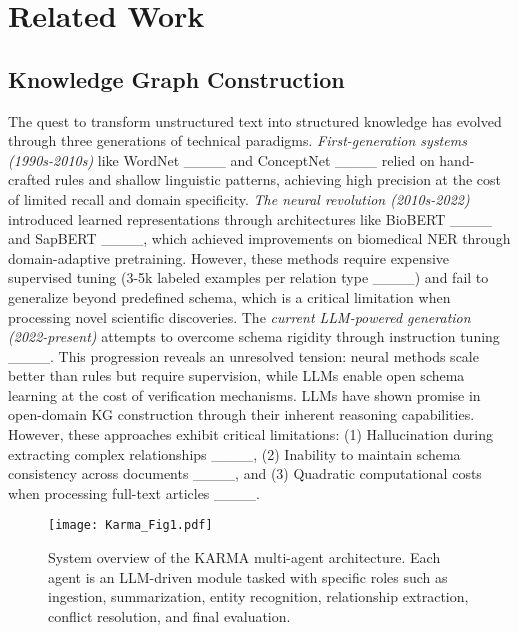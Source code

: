 \section{Related Work}
\subsection{Knowledge Graph Construction}
The quest to transform unstructured text into structured knowledge has evolved through three generations of technical paradigms. \emph{First-generation systems (1990s-2010s)} like WordNet ____ and ConceptNet ____ relied on hand-crafted rules and shallow linguistic patterns, achieving high precision at the cost of limited recall and domain specificity. \emph{The neural revolution (2010s-2022)} introduced learned representations through architectures like BioBERT ____ and SapBERT ____, which achieved improvements on biomedical NER through domain-adaptive pretraining. However, these methods require expensive supervised tuning (3-5k labeled examples per relation type ____) and fail to generalize beyond predefined schema, which is a critical limitation when processing novel scientific discoveries. The \emph{current LLM-powered generation (2022-present)} attempts to overcome schema rigidity through instruction tuning ____. This progression reveals an unresolved tension: neural methods scale better than rules but require supervision, while LLMs enable open schema learning at the cost of verification mechanisms. LLMs have shown promise in open-domain KG construction through their inherent reasoning capabilities. However, these approaches exhibit critical limitations: (1) Hallucination during extracting complex relationships ____, (2) Inability to maintain schema consistency across documents ____, and (3) Quadratic computational costs when processing full-text articles ____.

\begin{figure*}[t]
\centering
\texttt{[image: Karma\_Fig1.pdf]}
\caption{System overview of the KARMA multi-agent architecture. Each agent is an LLM-driven module tasked with specific roles such as ingestion, summarization, entity recognition, relationship extraction, conflict resolution, and final evaluation.}
\label{fig:fig2}
\end{figure*}


